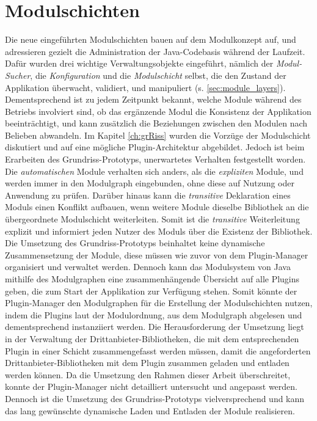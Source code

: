 \section{Modulschichten}
Die neue eingeführten Modulschichten bauen auf dem Modulkonzept auf, und adressieren gezielt die Administration der Java-Codebasis während der Laufzeit. Dafür wurden drei wichtige Verwaltungsobjekte eingeführt, nämlich der \textit{Modul-Sucher}, die \textit{Konfiguration} und die \textit{Modulschicht} selbst, die den Zustand der Applikation überwacht, validiert, und manipuliert (s. \ref{sec:module_layers}). Dementsprechend ist zu jedem Zeitpunkt bekannt, welche Module während des Betriebs involviert sind, ob das ergänzende Modul die Konsistenz der Applikation beeinträchtigt, und kann zusätzlich die Beziehungen zwischen den Modulen nach Belieben abwandeln. Im Kapitel \ref{ch:grRiss} wurden die Vorzüge der Modulschicht diskutiert und auf eine mögliche Plugin-Architektur abgebildet. Jedoch ist beim Erarbeiten des Grundriss-Prototyps, unerwartetes Verhalten festgestellt worden. Die \textit{automatischen} Module verhalten sich anders, als die \textit{expliziten} Module, und werden immer in den Modulgraph eingebunden, ohne diese auf Nutzung oder Anwendung zu prüfen. Darüber hinaus kann die \textit{transitive} Deklaration eines Moduls einen Konflikt aufbauen, wenn weitere Module dieselbe Bibliothek an die übergeordnete Modulschicht weiterleiten. Somit ist die \textit{transitive} Weiterleitung explizit und informiert jeden Nutzer des Moduls über die Existenz der Bibliothek.\newline
Die Umsetzung des Grundriss-Prototyps beinhaltet keine dynamische Zusammensetzung der Module, diese müssen wie zuvor von dem Plugin-Manager organisiert und verwaltet werden. Dennoch kann das Modulsystem von Java mithilfe des Modulgraphen eine zusammenhängende Übersicht auf alle Plugins geben, die zum Start der Applikation zur Verfügung stehen. Somit könnte der Plugin-Manager den Modulgraphen für die Erstellung der Modulschichten nutzen, indem die Plugins laut der Modulordnung, aus dem Modulgraph abgelesen und dementsprechend instanziiert werden. Die Herausforderung der Umsetzung liegt in der Verwaltung der Drittanbieter-Bibliotheken, die mit dem entsprechenden Plugin in einer Schicht zusammengefasst werden müssen, damit die angeforderten Drittanbieter-Bibliotheken mit dem Plugin zusammen geladen und entladen werden können. Da die Umsetzung den Rahmen dieser Arbeit überschreitet, konnte der Plugin-Manager nicht detailliert untersucht und angepasst werden. \newline 
Dennoch ist die Umsetzung des Grundriss-Prototyps vielversprechend und kann das lang gewünschte dynamische Laden und Entladen der Module realisieren. \bigbreak

